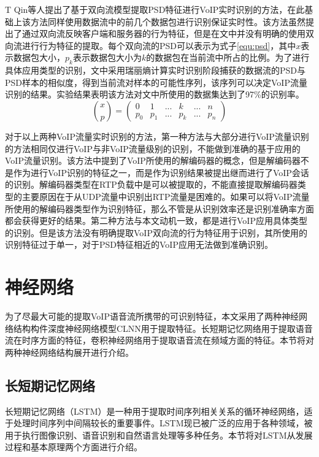 T Qin等人提出了基于双向流模型提取PSD特征进行VoIP实时识别的方法\supercite{22}，在此基础上该方法同样使用数据流中的前几个数据包进行识别保证实时性。该方法虽然提出了通过双向流反映客户端和服务器的行为特征，但是在文中并没有明确的使用双向流进行行为特征的提取。每个双向流的PSD可以表示为式子\ref{equ:psd}，其中$x$表示数据包大小，$p_{k}$表示数据包大小为$k$的数据包在当前流中所占的比例。为了进行具体应用类型的识别，文中采用瑞丽熵计算实时识别阶段捕获的数据流的PSD与PSD样本的相似度，得到当前流对样本的可能性序列，该序列可以决定VoIP流量识别的结果。实验结果表明该方法对文中所使用的数据集达到了97\%的识别率。
\begin{equation}
\label{equ:psd}
\binom{x}{p}=\begin{pmatrix}
0 & 1 & ... &  k&  ...&n \\ 
 p_{0}&  p_{1}&...  & p_{k} &...  & p_{n}
\end{pmatrix}
\end{equation}


对于以上两种VoIP流量实时识别的方法，第一种方法与大部分进行VoIP流量识别的方法相同仅进行VoIP与非VoIP流量级别的识别，不能做到准确的基于应用的VoIP流量识别。该方法中提到了VoIP所使用的解编码器的概念，但是解编码器不是作为进行VoIP识别的特征之一，而是作为识别结果被提出继而进行了VoIP会话的识别。解编码器类型在RTP负载中是可以被提取的，不能直接提取解编码器类型的主要原因在于从UDP流量中识别出RTP流量是困难的。如果可以将VoIP流量所使用的解编码器类型作为识别特征，那么不管是从识别效率还是识别准确率方面都会获得更好的结果。第二种方法与本文动机一致，都是进行VoIP应用具体类型的识别。但是该方法没有明确提取VoIP双向流的行为特征用于识别，其所使用的识别特征过于单一，对于PSD特征相近的VoIP应用无法做到准确识别。






\section{神经网络}
为了尽最大可能的提取VoIP语音流所携带的可识别特征，本文采用了两种神经网络结构构件深度神经网络模型CLNN用于提取特征。长短期记忆网络用于提取语音流在时序方面的特征，卷积神经网络用于提取语音流在频域方面的特征。本节将对两种神经网络结构展开进行介绍。
\subsection{长短期记忆网络}
长短期记忆网络（LSTM）是一种用于提取时间序列相关关系的循环神经网络，适于处理时间序列中间隔较长的重要事件。LSTM现已被广泛的应用于各种领域，被用于执行图像识别、语音识别和自然语言处理等多种任务。本节将对LSTM从发展过程和基本原理两个方面进行介绍。
